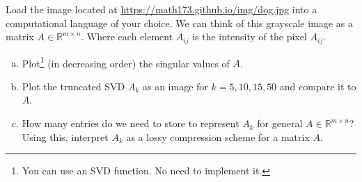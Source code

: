 \documentclass[12pt,letterpaper,cm]{hmcpset}
\begin{document}
\begin{solution}
    \vfill
\end{solution}

\begin{problem}[4]
    Load the image located at \url{https://math173.github.io/img/dog.jpg} into a computational language of your choice.
    We can think of this grayscale image as a matrix $A\in\mathbb{R}^{m\times n}$. Where each element $A_{ij}$ is
    the intensity of the pixel $A_{ij}$.
\begin{enumerate}[(a)]
    \item Plot\footnote{You can use an SVD function. No need to implement it.} (in decreasing order) the singular values of $A$.
    \item Plot the truncated SVD $A_k$ as an image for $k=5,10,15,50$ and compare it to $A$.
    \item How many entries do we need to store to represent $A_k$ for general $A\in\mathbb{R}^{m\times n}$?
        Using this, interpret $A_k$ as a lossy compression scheme for a matrix $A$.
\end{enumerate}
\end{problem}

\begin{solution}
    \vfill
\end{solution}
\clearpage
\end{document}
